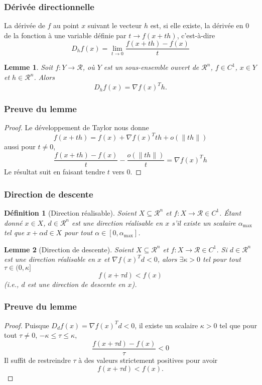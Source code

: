 \documentclass[usepdftitle=false]{beamer}
\newtheorem{defn}{Définition}
\newtheorem{lem}{Lemme}
\def\cR{\mathcal{R}}
\begin{document}
\begin{frame}
\frametitle{Dérivée directionnelle}

La dérivée de $f$ au point $x$ suivant le vecteur $h$ est, si elle existe, la dérivée en $0$ de la fonction à une variable définie par $t \rightarrow f(x+th)$, c'est-à-dire
$$
D_h f(x) = \lim_{t \rightarrow 0} \frac{f(x+th)-f(x)}{t}
$$

\begin{lem}
Soit $f: Y \rightarrow \cR$, où $Y$ est un sous-ensemble ouvert de $\cR^n$, $f \in C^1$, $x \in Y$ et $h \in \cR^n$. Alors
$$
D_h f(x) = \nabla f(x)^T h.
$$
\end{lem}

\end{frame}

\begin{frame}
\frametitle{Preuve du lemme}

\begin{proof}
Le développement de Taylor nous donne
$$
f(x+th) = f(x) + \nabla f(x)^T th + o(\| th \|)
$$
aussi pour $t \ne 0$,
$$
\frac{f(x+th) - f(x)}{t} - \frac{o(\| th \|)}{t} = \nabla f(x)^T h
$$
Le résultat suit en faisant tendre $t$ vers 0.
\end{proof}

\end{frame}

\begin{frame}
\frametitle{Direction de descente}

\begin{defn}[Direction réalisable]
Soient $X \subseteq \cR^n$ et $f: X \rightarrow \cR \in C^1$.
Étant donné $x \in X$, $d \in \cR^n$ est une direction réalisable en $x$ s'il existe un scalaire $\alpha_{\max}$ tel que $x + \alpha d \in X$  pour tout $\alpha \in [0, \alpha_{\max}]$. 
\end{defn}

\begin{lem}[Direction de descente]
Soient $X \subseteq \cR^n$ et $f: X \rightarrow \cR \in C^1$.
Si $d \in \cR^n$ est une direction réalisable en $x$ et $\nabla f(x)^T d < 0$, alors
$\exists \kappa > 0$ tel pour tout $\tau \in (0,\kappa]$
$$
f(x+\tau d) < f(x)
$$
(i.e., $d$ est une direction de descente en $x$).
\end{lem}

\end{frame}

\begin{frame}
\frametitle{Preuve du lemme}

\begin{proof}
Puisque $D_d f(x) = \nabla f(x)^T d < 0$, il existe un scalaire $\kappa > 0$ tel que pour tout $\tau \ne 0$, $-\kappa \leq \tau \leq \kappa$,
$$
\frac{f(x+\tau d) - f(x)}{\tau} < 0
$$
Il suffit de restreindre $\tau$ à des valeurs strictement positives pour avoir
$$
f(x+\tau d) < f(x).
$$
\end{proof}

\end{frame}
\end{document}
